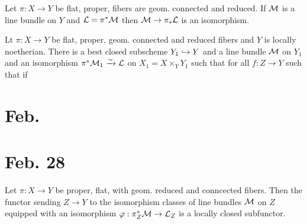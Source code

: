 \documentclass[12pt]{article}
\begin{document}
\begin{prop}
Let $\pi : X \to Y$ be flat, proper, fibers are geom. connected and reduced. If $\mathcal{M}$ is a line bundle on $Y$ and $\mathcal{L} = \pi^* \mathcal{M}$ then $\mathcal{M} \to \pi_* \mathcal{L}$ is an isomorphism.
\end{prop}

\begin{prop}
Lt $\pi : X \to Y$ be flat, proper, geom. connected and reduced fibers and $Y$ is locally noetherian. There is a best closed subscheme $Y_1 \hookrightarrow Y$ and a line bundle $\mathcal{M}$ on $Y_1$ and an isomorphism $\pi^* \mathcal{M}_1 \xrightarrow{\sim} \mathcal{L}$ on $X_1 = X \times_Y Y_1$ such that for all $f : Z \to Y$ such that if   
\end{prop}

\section{Feb.}

\section{Feb. 28}

\begin{thm}
Let $\pi : X \to Y$ be proper, flat, with geom. reduced and conncected fibers. Then the functor sending $Z \to Y$ to the isomorphism classes of line bundles $\mathcal{M}$ on $Z$ equipped with an isomorphism $\varphi : \pi_Z^* \mathcal{M} \to \mathcal{L}_Z$ is a locally closed subfunctor. 
\end{thm}
\end{document}
